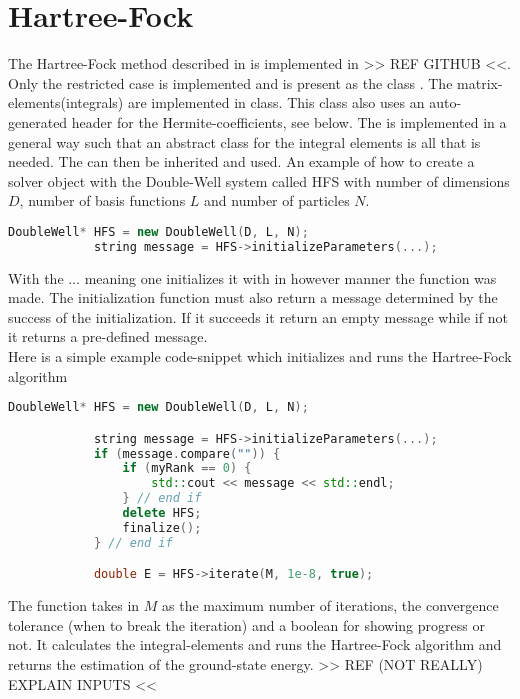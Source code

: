 \section{Hartree-Fock}
    The Hartree-Fock method described in  is implemented in
    >> REF GITHUB <<. Only the restricted case is implemented and is present as
    the class . The matrix-elements(integrals) are
    implemented in  class. This class also uses an
    auto-generated header for the Hermite-coefficients, see
     below. The  is
    implemented in a general way such that an abstract class for the integral
    elements is all that is needed. The  can then
    be inherited and used.  An example of how to create a solver object with
    the Double-Well system called HFS with number of dimensions $D$, number of
    basis functions $L$ and number of particles $N$.
        \begin{lstlisting}[language=C++, style=ccstyle]
            DoubleWell* HFS = new DoubleWell(D, L, N);
            string message = HFS->initializeParameters(...);
        \end{lstlisting}
    With the $\dots$ meaning one initializes it with in however manner the
    function was made. The initialization function must also return a message
    determined by the success of the initialization. If it succeeds it return
    an empty message while if not it returns a pre-defined message. \\ 
    Here is a simple example code-snippet which initializes and runs the
    Hartree-Fock algorithm
        \begin{lstlisting}[language=C++, style=ccstyle]
            DoubleWell* HFS = new DoubleWell(D, L, N);

            string message = HFS->initializeParameters(...);
            if (message.compare("")) {
                if (myRank == 0) {
                    std::cout << message << std::endl;
                } // end if
                delete HFS;
                finalize();
            } // end if

            double E = HFS->iterate(M, 1e-8, true);
        \end{lstlisting}
    The  function takes in $M$ as the maximum number of
    iterations, the convergence tolerance (when to break the iteration) and a
    boolean for showing progress or not. It calculates the integral-elements
    and runs the Hartree-Fock algorithm and returns the estimation of the
    ground-state energy. >> REF (NOT REALLY) EXPLAIN INPUTS <<

